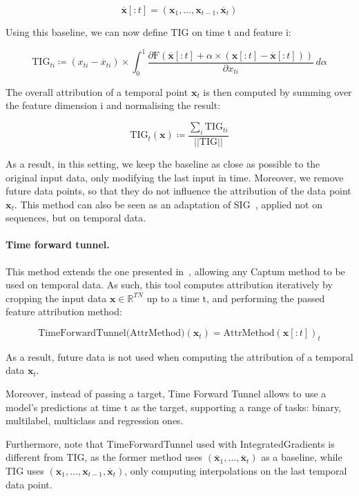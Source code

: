 \[ \overline{\textbf{x}}[:t] = (\textbf{x}_1, \dots, \textbf{x}_{t-1}, \overline{\textbf{x}}_t) \]

Using this baseline, we can now define TIG on time t and feature i:

\begin{equation}
    \textrm{TIG}_{ti} \coloneqq  (x_{ti} - \overline{x}_{ti}) \times
    \int_0^1 \frac{\partial \textrm{F}(\overline{\textbf{x}}[:t] + \alpha \times (\textbf{x}[:t] -
    \overline{\textbf{x}}[:t]))}{\partial x_{ti}} \, d\alpha
    \label{eq:tig}
\end{equation}

The overall attribution of a temporal point $\textbf{x}_t$ is then computed by summing over the feature dimension i and
normalising the result:

\[ \textrm{TIG}_t(\textbf{x}) \coloneqq \frac{\sum_i \textrm{TIG}_{ti}}{||\textrm{TIG}||} \]

As a result, in this setting, we keep the baseline as close as possible to the original input data, only modifying the
last input in time.
Moreover, we remove future data points, so that they do not influence the attribution of the data point $\textbf{x}_t$.
This method can also be seen as an adaptation of SIG~\citep{enguehard2023sequential}, applied not on sequences, but on
temporal data.


\paragraph{Time forward tunnel.}

This method extends the one presented in~\citep{tonekaboni2020went}, allowing any Captum method to be used on temporal
data.
As such, this tool computes attribution iteratively by cropping the input data $\textbf{x} \in \mathbb{R}^{TN}$ up to
a time t, and performing the passed feature attribution method:

\[ \textrm{TimeForwardTunnel(AttrMethod)}(\textbf{x}_t) = \textrm{AttrMethod}(\textbf{x}[:t])_t \]

As a result, future data is not used when computing the attribution of a temporal data $\textbf{x}_t$.

Moreover, instead of passing a target, Time Forward Tunnel allows to use a model's predictions at time t as the target,
supporting a range of tasks: binary, multilabel, multiclass and regression ones.

Furthermore, note that TimeForwardTunnel used with IntegratedGradients is different from TIG, as the former method uses
$(\overline{\textbf{x}}_1, \dots, \overline{\textbf{x}}_t)$ as a baseline, while TIG uses
$(\textbf{x}_1, \dots, \textbf{x}_{t-1}, \overline{\textbf{x}}_t)$,
only computing interpolations on the last temporal data point.


